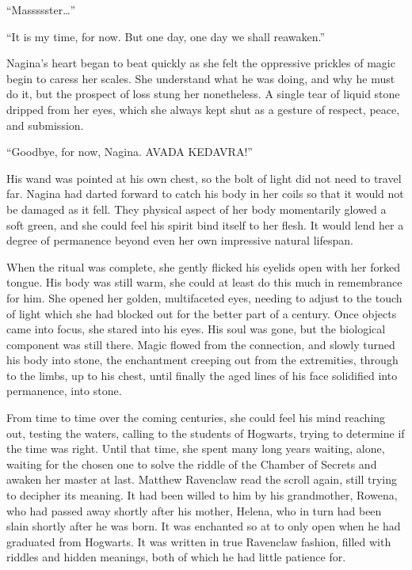 “Massssster…”

“It is my time, for now. But one day, one day we shall reawaken.”

Nagina’s heart began to beat quickly as she felt the oppressive prickles of magic begin to caress her scales. She understand what he was doing, and why he must do it, but the prospect of loss stung her nonetheless. A single tear of liquid stone dripped from her eyes, which she always kept shut as a gesture of respect, peace, and submission.

“Goodbye, for now, Nagina. AVADA KEDAVRA!”

His wand was pointed at his own chest, so the bolt of light did not need to travel far. Nagina had darted forward to catch his body in her coils so that it would not be damaged as it fell. They physical aspect of her body momentarily glowed a soft green, and she could feel his spirit bind itself to her flesh. It would lend her a degree of permanence beyond even her own impressive natural lifespan.

When the ritual was complete, she gently flicked his eyelids open with her forked tongue. His body was still warm, she could at least do this much in remembrance for him. She opened her golden, multifaceted eyes, needing to adjust to the touch of light which she had blocked out for the better part of a century. Once objects came into focus, she stared into his eyes. His soul was gone, but the biological component was still there. Magic flowed from the connection, and slowly turned his body into stone, the enchantment creeping out from the extremities, through to the limbs, up to his chest, until finally the aged lines of his face solidified into permanence, into stone.

From time to time over the coming centuries, she could feel his mind reaching out, testing the waters, calling to the students of Hogwarts, trying to determine if the time was right. Until that time, she spent many long years waiting, alone, waiting for the chosen one to solve the riddle of the Chamber of Secrets and awaken her master at last.
\simpleline
{}
Matthew Ravenclaw read the scroll again, still trying to decipher its meaning. It had been willed to him by his grandmother, Rowena, who had passed away shortly after his mother, Helena, who in turn had been slain shortly after he was born. It was enchanted so at to only open when he had graduated from Hogwarts. It was written in true Ravenclaw fashion, filled with riddles and hidden meanings, both of which he had little patience for.

